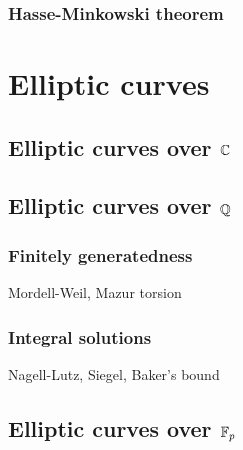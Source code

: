 \documentclass{../../large}
\begin{document}
\section{Hasse-Minkowski theorem}




\part{Elliptic curves}
\chapter{Elliptic curves over $\mathbb{C}$}
\chapter{Elliptic curves over $\mathbb{Q}$}
\section{Finitely generatedness}
Mordell-Weil, Mazur torsion
\section{Integral solutions}
Nagell-Lutz, Siegel, Baker's bound
\chapter{Elliptic curves over $\mathbb{F}_p$}
\end{document}
